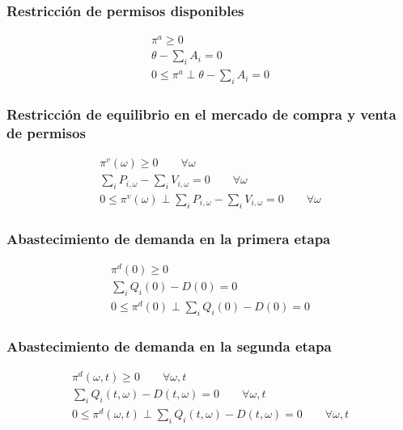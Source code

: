 \subsubsection{Restricción de permisos disponibles}
\begin{footnotesize}
\begin{align}
 \pi^a \geq 0 \\
 \theta - \sum_{i}A_i = 0 \\
0 \leq \pi^a \perp \theta - \sum_{i}A_i= 0 \label{complementariedadcondicion1}
\end{align}
\end{footnotesize}


\subsubsection{Restricción de equilibrio en el mercado de compra y venta de permisos}
\begin{footnotesize}
\begin{align}
 \pi^v(\omega) \geq 0 \qquad \forall \omega\\
 \sum_{i}P_{i,\omega} - \sum_{i}V_{i,\omega} = 0 \qquad \forall \omega \\
0 \leq \pi^v(\omega) \perp \sum_{i}P_{i,\omega} - \sum_{i}V_{i,\omega} = 0 \qquad \forall \omega
\end{align}
\end{footnotesize}


\subsubsection{Abastecimiento de demanda en la primera etapa}

\begin{footnotesize}
\begin{align}
 \pi^d(0) \geq 0 \\
 \sum_{i}Q_i(0) - D(0) = 0\\
0 \leq \pi^d(0) \perp \sum_{i}Q_i(0) - D(0)= 0
\end{align}
\end{footnotesize}


\subsubsection{Abastecimiento de demanda en la segunda etapa}

\begin{footnotesize}
\begin{align}
 \pi^d(\omega,t) \geq 0 \qquad \forall \omega,t\\
 \sum_{i}Q_i(t,\omega) - D(t,\omega) = 0 \qquad \forall \omega,t\\
 0 \leq \pi^d(\omega,t) \perp \sum_{i}Q_i(t,\omega) - D(t,\omega) = 0 \qquad \forall \omega,t
\end{align}
\end{footnotesize}




